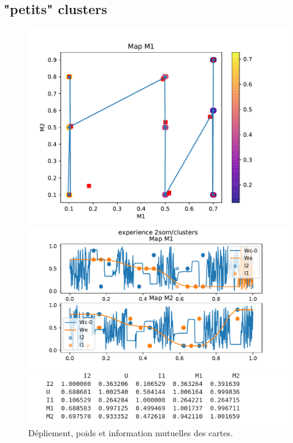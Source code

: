 \subsection{"petits" clusters}

\begin{figure}[h!]
\begin{minipage}{0.33\textwidth}
\centering\includegraphics[width=\textwidth]{2som_cluster_din}
\end{minipage}
\begin{minipage}{0.33\textwidth}
\centering\includegraphics[width=\textwidth]{2som_cluster_w}
\end{minipage}
\begin{minipage}{0.33\textwidth}
\centering\includegraphics[width=\textwidth]{2som_clusterssmall_im.png}
\end{minipage}
\caption{Dépliement, poids et information mutuelles des cartes. }
\label{fig:cluster}
\end{figure}

